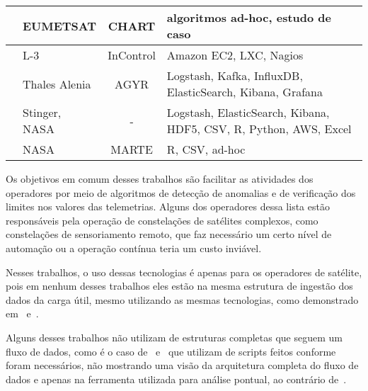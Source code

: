 \begin{table}[htbp]
\begin{center}
\begin{tabular}{|C{8em}|C{6em}|c|C{10em}|}
			\hline
			\cite{trollopeAnalysisAutomatedTechniques2018} & EUMETSAT           & CHART                & algoritmos ad-hoc, estudo de caso                                                    \\
			\hline
			\cite{gillesFlyingLargeConstellations2016}     & L-3                & InControl            & Amazon EC2, LXC, Nagios                                                              \\
			\hline
			\cite{hennionBigdataSatelliteYearly2018}       & Thales Alenia      & AGYR                 & Logstash, Kafka, InfluxDB, ElasticSearch, Kibana, Grafana                            \\
			\hline
			\cite{mateikUsingBigData2017}                  & Stinger, NASA      & -                    & Logstash, ElasticSearch, Kibana, HDF5, CSV, R, Python, AWS, Excel                    \\
			\hline
			\cite{fernandezTelemetryAnomalyDetection2017}  & NASA               & MARTE                & R, CSV, ad-hoc                                                                       \\
			\hline
		\end{tabular}
	\end{center}
\end{table}

Os objetivos em comum desses trabalhos são facilitar as atividades dos operadores por meio de algoritmos de detecção de anomalias e de verificação dos limites nos valores das telemetrias.
Alguns dos operadores dessa lista estão responsáveis pela operação de constelações de satélites complexos, como constelações de sensoriamento remoto, que faz necessário um certo nível de automação ou a operação contínua teria um custo inviável.

Nesses trabalhos, o uso dessas tecnologias é apenas para os operadores de satélite, pois em nenhum desses trabalhos eles estão na mesma estrutura de ingestão dos dados da carga útil, mesmo utilizando as mesmas tecnologias, como demonstrado em~\cite{mateikUsingBigData2017} e~\cite{adamskiDataAnalyticsLarge2016}.

Alguns desses trabalhos não utilizam de estruturas completas que seguem um fluxo de dados, como é o caso de~\cite{fernandezTelemetryAnomalyDetection2017} e~\cite{trollopeAnalysisAutomatedTechniques2018} que utilizam de scripts feitos conforme foram necessários, não mostrando uma visão da arquitetura completa do fluxo de dados e apenas na ferramenta utilizada para análise pontual, ao contrário de~\cite{yvernesCopernicusGroundSegment2018}.

